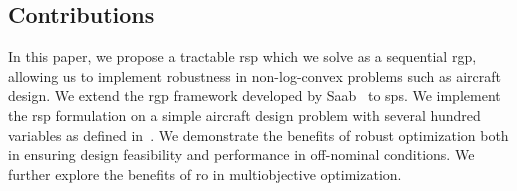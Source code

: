\subsection{Contributions}

In this paper, we propose a tractable \gls{rsp} which we solve as a sequential \gls{rgp},
allowing us to implement robustness in non-log-convex problems such as aircraft design.
We extend the \gls{rgp} framework developed by Saab~\cite{Saab2018} to \gls{sp}s.
We implement the \gls{rsp} formulation on a simple aircraft design problem with several hundred
variables as defined in~\cite{Ozturk2018}.
We demonstrate the benefits of robust optimization both in ensuring design feasibility and performance
in off-nominal conditions. We further explore the benefits of \gls{ro} in multiobjective optimization.



